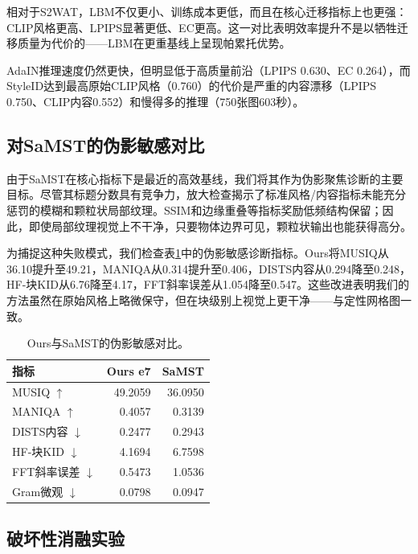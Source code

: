 ﻿\documentclass[letterpaper]{article}
\begin{document}
相对于S2WAT，LBM不仅更小、训练成本更低，而且在核心迁移指标上也更强：CLIP风格更高、LPIPS显著更低、EC更高。这一对比表明效率提升不是以牺牲迁移质量为代价的——LBM在更重基线上呈现帕累托优势。

AdaIN推理速度仍然更快，但明显低于高质量前沿（LPIPS 0.630、EC 0.264），而StyleID达到最高原始CLIP风格（0.760）的代价是严重的内容漂移（LPIPS 0.750、CLIP内容0.552）和慢得多的推理（750张图603秒）。

\subsection{对SaMST的伪影敏感对比}
由于SaMST在核心指标下是最近的高效基线，我们将其作为伪影聚焦诊断的主要目标。尽管其标题分数具有竞争力，放大检查揭示了标准风格/内容指标未能充分惩罚的模糊和颗粒状局部纹理。SSIM和边缘重叠等指标奖励低频结构保留；因此，即使局部纹理视觉上不干净，只要物体边界可见，颗粒状输出也能获得高分。

为捕捉这种失败模式，我们检查表\ref{tab:artifact}中的伪影敏感诊断指标。Ours将MUSIQ从36.10提升至49.21，MANIQA从0.314提升至0.406，DISTS内容从0.294降至0.248，HF-块KID从6.76降至4.17，FFT斜率误差从1.054降至0.547。这些改进表明我们的方法虽然在原始风格上略微保守，但在块级别上视觉上更干净——与定性网格图一致。

\begin{table}[t]
\centering
\caption{Ours与SaMST的伪影敏感对比。}
\label{tab:artifact}
\begin{tabular}{lrr}
\toprule
指标 & Ours e7 & SaMST \\
\midrule
MUSIQ $\uparrow$ & 49.2059 & 36.0950 \\
MANIQA $\uparrow$ & 0.4057 & 0.3139 \\
DISTS内容 $\downarrow$ & 0.2477 & 0.2943 \\
HF-块KID $\downarrow$ & 4.1694 & 6.7598 \\
FFT斜率误差 $\downarrow$ & 0.5473 & 1.0536 \\
Gram微观 $\downarrow$ & 0.0798 & 0.0947 \\
\bottomrule
\end{tabular}
\end{table}

\subsection{破坏性消融实验}
\begin{table}[t]
\centering
\caption{严格750协议下的破坏性消融实验。}
\label{tab:ablation}
\end{table}
\end{document}
